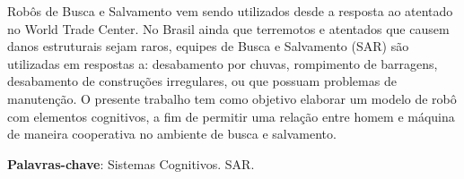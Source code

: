\documentclass[
	article,			%
	10pt,				%
	oneside,			%
	a4paper,			%
	english,			%
	brazil,				%
	sumario=tradicional	
	]{abntex2}
\begin{document}

\frenchspacing 


%
%

\maketitle





\begin{resumoumacoluna}
Robôs de Busca e Salvamento vem sendo utilizados desde a resposta ao atentado no World Trade Center. No Brasil ainda que terremotos e atentados que causem danos estruturais sejam raros, equipes de Busca e Salvamento (SAR) são utilizadas em respostas a: desabamento por chuvas, rompimento de barragens, desabamento de construções irregulares, ou que possuam problemas de manutenção. O presente trabalho tem como objetivo elaborar um modelo de robô com elementos cognitivos, a fim de permitir uma relação entre homem e máquina de maneira cooperativa no ambiente de busca e salvamento. 
 
 \vspace{\onelineskip}
 
 \noindent
 \textbf{Palavras-chave}: Sistemas Cognitivos. SAR. 
\end{resumoumacoluna}


%
% 
\end{document}
